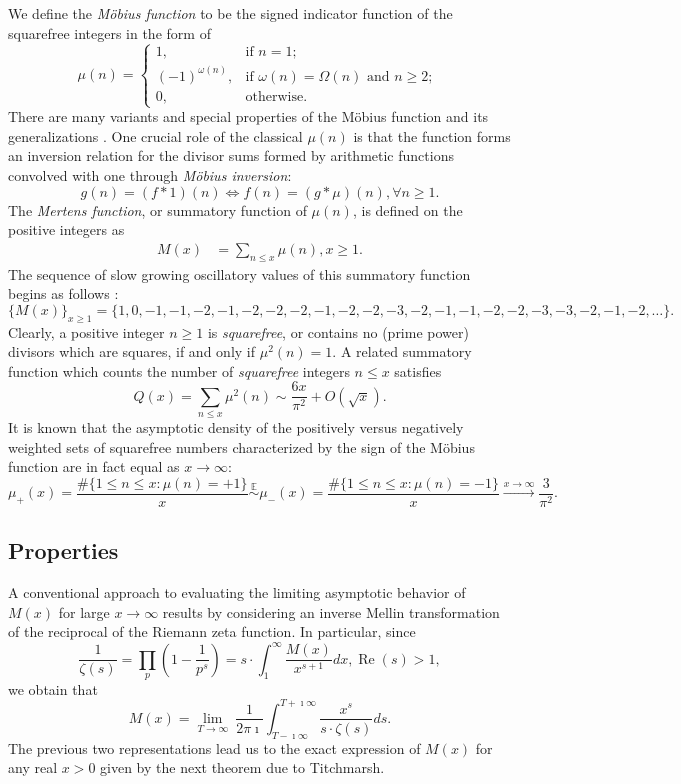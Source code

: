 \documentclass[11pt,reqno,a4letter]{article}
\numberwithin{figure}{section}
\numberwithin{table}{section}
\newcommand{\cf}{\textit{cf.\ }}
\newcommand{\seqnum}[1]{\href{http://oeis.org/#1}{\color{ProcessBlue}{\underline{#1}}}}
\theoremstyle{plain}
\numberwithin{theorem}{section}
\theoremstyle{definition}
\renewcommand{\Re}{\operatorname{Re}}
\begin{document}
We define the \emph{M\"obius function} to be the signed indicator function 
of the squarefree integers in the form of \cite[\seqnum{A008683}]{OEIS} 
\[
\mu(n) = \begin{cases} 
     1, & \text{if $n = 1$; } \\ 
     (-1)^{\omega(n)}, & \text{if $\omega(n) = \Omega(n)$ and $n \geq 2$; } \\ 
     0, & \text{otherwise.} 
     \end{cases} 
\]
There are many variants and special properties of the M\"obius function 
and its generalizations \cite[\cf \S 2]{HANDBOOKNT-2004}. 
One crucial role of the classical $\mu(n)$ is that the function forms an inversion relation 
for the divisor sums formed by arithmetic functions convolved with one through \emph{M\"obius inversion}: 
\[
g(n) = (f \ast 1)(n) \iff f(n) = (g \ast \mu)(n), \forall n \geq 1. 
\]
The \emph{Mertens function}, or summatory function of $\mu(n)$, is defined on the 
positive integers as 
\begin{align*} 
M(x) & = \sum_{n \leq x} \mu(n), x \geq 1. 
\end{align*} 
The sequence of slow growing oscillatory values of this 
summatory function begins as follows \cite[\seqnum{A002321}]{OEIS}: 
\[
\{M(x)\}_{x \geq 1} = \{1, 0, -1, -1, -2, -1, -2, -2, -2, -1, -2, -2, -3, -2, 
     -1, -1, -2, -2, -3, -3, -2, -1, -2, \ldots\}. 
\]
Clearly, a positive integer $n \geq 1$ is \emph{squarefree}, or contains no (prime power) divisors which are 
squares, if and only if $\mu^2(n) = 1$. 
A related summatory function which counts the 
number of \emph{squarefree} integers $n \leq x$ satisfies 
\cite[\S 18.6]{HARDYWRIGHT} \cite[\seqnum{A013928}]{OEIS} 
\[ 
Q(x) = \sum_{n \leq x} \mu^2(n) \sim \frac{6x}{\pi^2} + O\left(\sqrt{x}\right). 
\] 
It is known that the asymptotic density of the positively versus negatively 
weighted sets of squarefree numbers characterized by the sign of the 
M\"obius function are in fact equal as $x \rightarrow \infty$: 
\[
\mu_{+}(x) = \frac{\#\{1 \leq n \leq x: \mu(n) = +1\}}{x} \overset{\mathbb{E}}{\sim} 
     \mu_{-}(x) = \frac{\#\{1 \leq n \leq x: \mu(n) = -1\}}{x} 
     \xrightarrow{x \rightarrow \infty} \frac{3}{\pi^2}. 
\]

\subsection{Properties} 

A conventional approach to evaluating the limiting asymptotic 
behavior of $M(x)$ for large $x \rightarrow \infty$ results by considering an 
inverse Mellin transformation of the reciprocal of the Riemann zeta function. 
In particular, since 
\[
\frac{1}{\zeta(s)} = \prod_{p} \left(1 - \frac{1}{p^s}\right) = 
     s \cdot \int_1^{\infty} \frac{M(x)}{x^{s+1}} dx, \Re(s) > 1, 
\]
we obtain that 
\[
M(x) = \lim_{T \rightarrow \infty}\ \frac{1}{2\pi\imath} \int_{T-\imath\infty}^{T+\imath\infty} 
     \frac{x^s}{s \cdot \zeta(s)} ds. 
\] 
The previous two representations lead us to the 
exact expression of $M(x)$ for any real $x > 0$ 
given by the next theorem due to Titchmarsh. 
\nocite{TITCHMARSH} 
\end{document}
